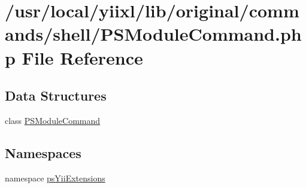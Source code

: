 \hypertarget{PSModuleCommand_8php}{
\section{/usr/local/yiixl/lib/original/commands/shell/PSModuleCommand.php File Reference}
\label{PSModuleCommand_8php}
}
\subsection*{Data Structures}
\begin{DoxyCompactItemize}
\item 
class \hyperlink{classPSModuleCommand}{PSModuleCommand}
\end{DoxyCompactItemize}
\subsection*{Namespaces}
\begin{DoxyCompactItemize}
\item 
namespace \hyperlink{namespacepsYiiExtensions}{psYiiExtensions}
\end{DoxyCompactItemize}

